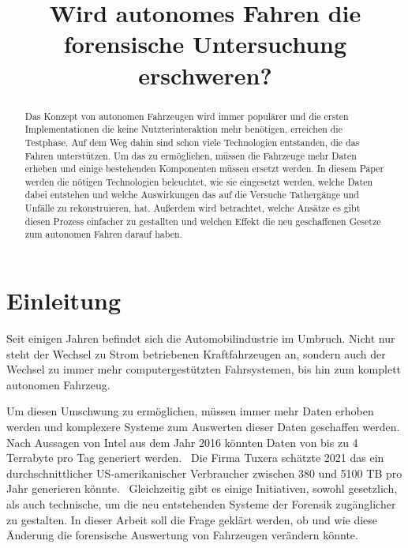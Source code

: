 \documentclass[conference,compsoc,final,a4paper]{IEEEtran}
\newcommand{\autoren}[0]{Gleumes, Folke Henning}
\newcommand{\dokumententitel}[0]{Wird autonomes Fahren die forensische Untersuchung erschweren?}
\begin{document}
\title{\dokumententitel}

\author{
  \IEEEauthorblockN{\autoren}
}

\maketitle
\thispagestyle{plain}
\pagestyle{plain}

\begin{abstract}
  Das Konzept von autonomen Fahrzeugen wird immer populärer und die ersten Implementationen die keine Nutzterinteraktion mehr
  benötigen, erreichen die Testphase. Auf dem Weg dahin sind schon viele Technologien entstanden, die das Fahren unterstützen.
  Um das zu ermöglichen, müssen die Fahrzeuge mehr Daten erheben und einige bestehenden Komponenten müssen ersetzt werden.
  In diesem Paper werden die nötigen Technologien beleuchtet, wie sie eingesetzt werden,
  welche Daten dabei entstehen und welche Auswirkungen das auf die Versuche Tathergänge und Unfälle zu rekonstruieren, hat.
  Außerdem wird betrachtet, welche Ansätze es gibt diesen Prozess einfacher zu gestallten und welchen Effekt die neu geschaffenen
  Gesetze zum autonomen Fahren darauf haben.
\end{abstract}

{\small\tableofcontents}

\section{Einleitung}

Seit einigen Jahren befindet sich die Automobilindustrie im Umbruch. Nicht nur steht der Wechsel zu Strom betriebenen Kraftfahrzeugen an,
sondern auch der Wechsel zu immer mehr computergestützten Fahrsystemen, bis hin zum komplett autonomen Fahrzeug.

Um diesen Umschwung zu ermöglichen, müssen immer mehr Daten erhoben werden und komplexere Systeme zum Auswerten dieser Daten geschaffen werden.
Nach Aussagen von Intel aus dem Jahr 2016 könnten Daten von bis zu 4 Terrabyte pro Tag generiert werden.~\cite{Nelson2016}
Die Firma Tuxera schätzte 2021 das ein durchschnittlicher US-amerikanischer Verbraucher zwischen 380 und 5100 TB pro Jahr generieren könnte.~\cite{Wright2021}
Gleichzeitig gibt es einige Initiativen, sowohl gesetzlich\cite{Boehm2020}, als auch technische\cite{Hoque_2021a}\cite{Lee_2019}, um die neu entstehenden Systeme der Forensik zugänglicher zu gestalten.
In dieser Arbeit soll die Frage geklärt werden, ob und wie diese Änderung die forensische Auswertung von Fahrzeugen verändern könnte.
\end{document}
